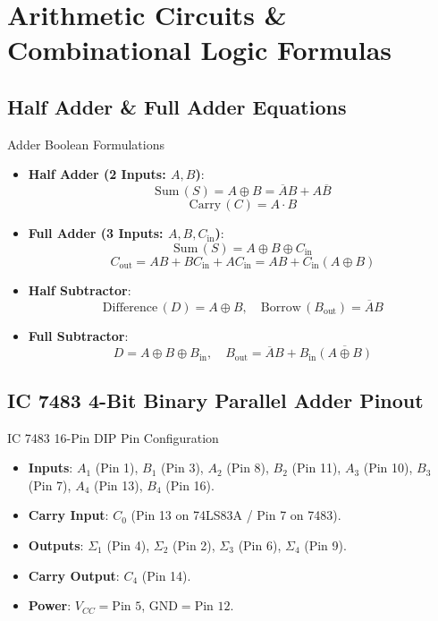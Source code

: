 \chapter{Arithmetic Circuits \& Combinational Logic Formulas}

\section{Half Adder \& Full Adder Equations}
\begin{formulabox}{Adder Boolean Formulations}
\begin{itemize}
    \item \textbf{Half Adder (2 Inputs: $A, B$)}:
    \[ \mathrm{Sum}\,(S) = A \oplus B = \overline{A}B + A\overline{B} \]
    \[ \mathrm{Carry}\,(C) = A \cdot B \]
    \item \textbf{Full Adder (3 Inputs: $A, B, C_{\mathrm{in}}$)}:
    \[ \mathrm{Sum}\,(S) = A \oplus B \oplus C_{\mathrm{in}} \]
    \[ C_{\mathrm{out}} = AB + BC_{\mathrm{in}} + AC_{\mathrm{in}} = AB + C_{\mathrm{in}}(A \oplus B) \]
    \item \textbf{Half Subtractor}:
    \[ \mathrm{Difference}\,(D) = A \oplus B, \quad \mathrm{Borrow}\,(B_{\mathrm{out}}) = \overline{A}B \]
    \item \textbf{Full Subtractor}:
    \[ D = A \oplus B \oplus B_{\mathrm{in}}, \quad B_{\mathrm{out}} = \overline{A}B + B_{\mathrm{in}}\overline{(A \oplus B)} \]
\end{itemize}
\end{formulabox}

\section{IC 7483 4-Bit Binary Parallel Adder Pinout}
\begin{formulabox}{IC 7483 16-Pin DIP Pin Configuration}
\begin{itemize}
    \item \textbf{Inputs}: $A_1$ (Pin 1), $B_1$ (Pin 3), $A_2$ (Pin 8), $B_2$ (Pin 11), $A_3$ (Pin 10), $B_3$ (Pin 7), $A_4$ (Pin 13), $B_4$ (Pin 16).
    \item \textbf{Carry Input}: $C_0$ (Pin 13 on 74LS83A / Pin 7 on 7483).
    \item \textbf{Outputs}: $\Sigma_1$ (Pin 4), $\Sigma_2$ (Pin 2), $\Sigma_3$ (Pin 6), $\Sigma_4$ (Pin 9).
    \item \textbf{Carry Output}: $C_4$ (Pin 14).
    \item \textbf{Power}: $V_{CC} = \text{Pin 5}$, $\mathrm{GND} = \text{Pin 12}$.
\end{itemize}
\end{formulabox}
